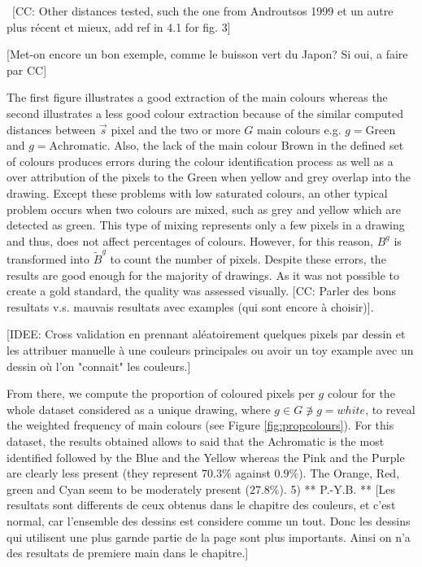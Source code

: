 \documentclass[11pt,a4paper]{article}
\begin{document}
\
{\color{red}[CC: Other distances tested, such the one from Androutsos 1999 et un autre plus récent et mieux, add ref in 4.1 for fig. 3]}

{\color{red}[Met-on encore un bon exemple, comme le buisson vert du Japon? Si oui, a faire par CC]}

The first figure illustrates a good extraction of the main colours whereas the second illustrates a less good colour extraction because of the similar computed distances between $\vec{s}$  pixel and the two or more $G$ main colours e.g. $g = \mbox{Green}$ and $g = \mbox{Achromatic}$. 
Also, the lack of the main colour Brown in the defined set of colours produces errors during the colour identification process as well as a over attribution of the pixels to the Green when yellow and grey overlap into the drawing. Except these problems with low saturated colours, an other typical problem occurs when two colours are mixed, such as grey and yellow which are detected as green. This type of mixing represents only a few pixels in a drawing and thus, does not affect percentages of colours. However, for this reason, $B^g$ is transformed into $\tilde{B}^g$ to count the number of pixels. Despite these errors, the results are good enough for the majority of drawings. As it was not possible to create a gold standard, the quality was assessed visually.
{\color{red}[CC:  Parler des bons resultats v.s. mauvais resultats avec examples (qui sont encore \`a choisir)]}.

{\small \color{teal}[IDEE: Cross validation en prennant al\' eatoirement quelques pixels par dessin et les attribuer manuelle \`a une couleurs principales ou avoir un toy example avec un dessin o\`u l'on "connait" les couleurs.]}

From there, we compute the proportion of coloured pixels per $g$ colour for the whole dataset considered as a unique drawing, where $g \in G \not\ni g = white$, to reveal the weighted frequency of main colours (see Figure \ref{fig:propcolours}). 
For this dataset, the results obtained allows to said that the Achromatic is the most identified followed by the Blue and the Yellow whereas the Pink and the Purple are clearly less present (they represent $70.3\%$ against $0.9\%$). The Orange, Red, green and Cyan seem to be moderately present ($27.8\%$). 
{\color{red} 5) ** P.-Y.B. ** [Les resultats sont differents de ceux obtenus dans le chapitre des couleurs, et c'est normal, car l'ensemble des dessins est considere comme un tout. Donc les dessins qui utilisent une plus garnde partie de la page sont plus importants. Ainsi on n'a des resultats de premiere main dans le chapitre.]}
\end{document}
